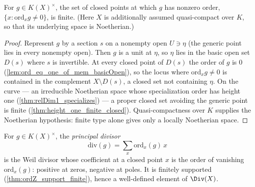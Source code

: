 \begin{theorem}
  \label{thm:ordZ_support_finite}
  \leanok
  For \(g \in K(X)^\times\), the set of closed points at which \(g\) has nonzero order,
  \(\{ x : \mathrm{ord}_x g \neq 0 \}\), is finite. (Here \(X\) is additionally assumed
  quasi-compact over \(K\), so that its underlying space is Noetherian.)
\end{theorem}
\begin{proof}
  \leanok
  Represent \(g\) by a section \(s\) on a nonempty open \(U \ni \eta\) (the generic point lies in
  every nonempty open). Then \(g\) is a unit at \(\eta\), so \(\eta\) lies in the basic open set
  \(D(s)\) where \(s\) is invertible. At every closed point of \(D(s)\) the order of \(g\) is \(0\)
  (\ref{lem:ord_eq_one_of_mem_basicOpen}), so the locus where \(\mathrm{ord}_x g \neq 0\) is
  contained in the complement \(X \setminus D(s)\), a closed set not containing \(\eta\). On the
  curve --- an irreducible Noetherian space whose specialization order has height one
  (\ref{thm:relDim1_specializes}) --- a proper closed set avoiding the generic point is finite
  (\ref{thm:height_one_finite_closed}). Quasi-compactness over \(K\) supplies the Noetherian
  hypothesis: finite type alone gives only a locally Noetherian space.
\end{proof}

\begin{definition}
  \label{def:divOf}
  \leanok
  For \(g \in K(X)^\times\), the \emph{principal divisor}
  \[
    \mathrm{div}(g) = \sum_{x} \mathrm{ord}_x(g)\, x
  \]
  is the Weil divisor whose coefficient at a closed point \(x\) is the order of vanishing
  \(\mathrm{ord}_x(g)\): positive at zeros, negative at poles. It is finitely supported
  (\ref{thm:ordZ_support_finite}), hence a well-defined element of \(\Div(X)\).
\end{definition}

